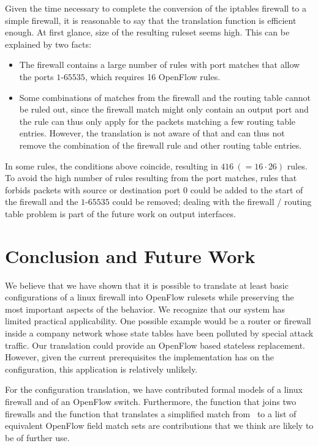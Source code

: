 Given the time necessary to complete the conversion of the iptables firewall to a simple firewall, it is reasonable to say that the translation function is efficient enough.
At first glance, size of the resulting ruleset seems high. 
This can be explained by two facts:
\begin{itemize}
	\item The firewall contains a large number of rules with port matches that allow the ports $1$-$65535$, which requires 16 OpenFlow rules.
	\item Some combinations of matches from the firewall and the routing table cannot be ruled out, since the firewall match might only contain an output port and the rule can thus only apply for the packets matching a few routing table entries. 
	However, the translation is not aware of that and can thus not remove the combination of the firewall rule and other routing table entries.
\end{itemize}
In some rules, the conditions above coincide, resulting in $416\ (=16 \cdot 26)$ rules.
To avoid the high number of rules resulting from the port matches, rules that forbids packets with source or destination port 0 could be added to the start of the firewall and the $1$-$65535$ could be removed;
dealing with the firewall / routing table problem is part of the future work on output interfaces.

\section{Conclusion and Future Work}
We believe that we have shown that it is possible to translate at least basic configurations of a linux firewall into OpenFlow rulesets while preserving the most important aspects of the behavior.
We recognize that our system has limited practical applicability.
One possible example would be a router or firewall inside a company network whose state tables have been polluted by special attack traffic.
Our translation could provide an OpenFlow based stateless replacement.
However, given the current prerequisites the implementation has on the configuration, this application is relatively unlikely.

For the configuration translation, we have contributed formal models of a linux firewall and of an OpenFlow switch.
Furthermore, the function that joins two firewalls and the function that translates a simplified match from~\cite{diekmann2016verified} to a list of equivalent OpenFlow field match sets are contributions that we think are likely to be of further use.

